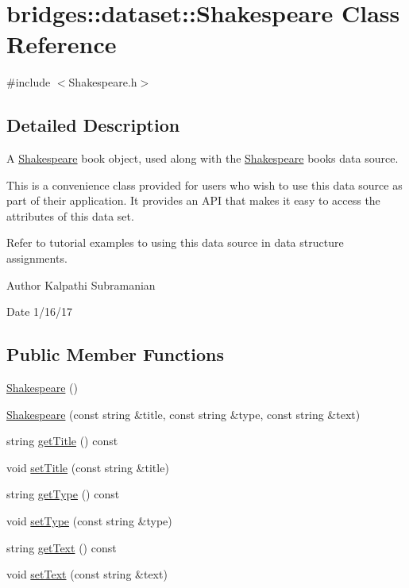 \hypertarget{classbridges_1_1dataset_1_1_shakespeare}{}\section{bridges\+:\+:dataset\+:\+:Shakespeare Class Reference}
\label{classbridges_1_1dataset_1_1_shakespeare}


{\ttfamily \#include $<$Shakespeare.\+h$>$}



\subsection{Detailed Description}
A \hyperlink{classbridges_1_1dataset_1_1_shakespeare}{Shakespeare} book object, used along with the \hyperlink{classbridges_1_1dataset_1_1_shakespeare}{Shakespeare} books data source. 

This is a convenience class provided for users who wish to use this data source as part of their application. It provides an A\+PI that makes it easy to access the attributes of this data set.

Refer to tutorial examples to using this data source in data structure assignments.

\begin{DoxyAuthor}{Author}
Kalpathi Subramanian 
\end{DoxyAuthor}
\begin{DoxyDate}{Date}
1/16/17 
\end{DoxyDate}
\subsection*{Public Member Functions}
\begin{DoxyCompactItemize}
\item 
\hyperlink{classbridges_1_1dataset_1_1_shakespeare_a58ff458b70e8198b2e235eacd17be91c}{Shakespeare} ()
\item 
\hyperlink{classbridges_1_1dataset_1_1_shakespeare_a859f3625fb8019967aa8083f20993cad}{Shakespeare} (const string \&title, const string \&type, const string \&text)
\item 
string \hyperlink{classbridges_1_1dataset_1_1_shakespeare_a00ff743145899bf88435b194b6291ce7}{get\+Title} () const
\item 
void \hyperlink{classbridges_1_1dataset_1_1_shakespeare_a92c11a229b38913fea73cfe26474587b}{set\+Title} (const string \&title)
\item 
string \hyperlink{classbridges_1_1dataset_1_1_shakespeare_af0cc6fd91d90e663d343c52756e9f191}{get\+Type} () const
\item 
void \hyperlink{classbridges_1_1dataset_1_1_shakespeare_a4e9d1126524d2b10f5fe36ffd4588f15}{set\+Type} (const string \&type)
\item 
string \hyperlink{classbridges_1_1dataset_1_1_shakespeare_a23de5e2229cc15bb1c9f1eacaee007ee}{get\+Text} () const
\item 
void \hyperlink{classbridges_1_1dataset_1_1_shakespeare_af285363fb2bfe9cf302786ae31d4cc8c}{set\+Text} (const string \&text)
\end{DoxyCompactItemize}


